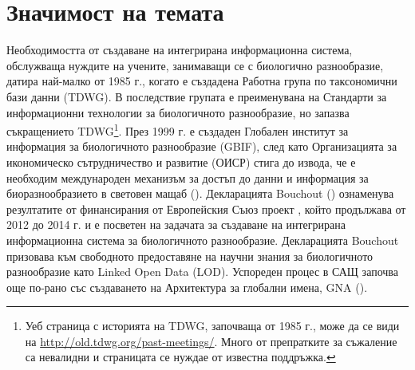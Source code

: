 \label{chapter-introduction} 
\newcommand{\keyword}[1]{\textbf{#1}}
\newcommand{\tabhead}[1]{\textbf{#1}}
\newcommand{\code}[1]{\texttt{#1}}
\newcommand{\file}[1]{\texttt{\bfseries#1}}
\newcommand{\option}[1]{\texttt{\itshape#1}}


\section* {Значимост на темата}

Необходимостта от създаване на интегрирана информационна система, обслужваща нуждите на учените, занимаващи се с биологично разнообразие, датира най-малко от 1985 г., когато е създадена Работна група по таксономични бази данни (TDWG). В последствие групата е преименувана на Стандарти за информационни технологии за биологичното разнообразие, но запазва съкращението TDWG\footnote{Уеб страница с историята на TDWG, започваща от 1985 г., може да се види на \url{http://old.tdwg.org/past-meetings/}. Много от препратките за съжаление са невалидни и страницата се нуждае от известна поддръжка.}. През 1999 г. е създаден Глобален институт за информация за биологичното разнообразие (GBIF), след като Организацията за икономическо сътрудничество и развитие (ОИСР) стига до извода, че е необходим международен механизъм за достъп до данни и информация за биоразнообразието в световен мащаб (\cite{noauthor_what_nodate}). Декларацията Bouchout (\cite{noauthor_bouchout_2014}) ознаменува резултатите от финансирания от Европейския Съюз проект \cite{noauthor_pro-ibiosphere_nodate}, който продължава от 2012 до 2014 г. и е посветен на задачата за създаване на интегрирана информационна система за биологичното разнообразие. Декларацията Bouchout призовава към свободното предоставяне на научни знания за биологичното разнообразие като Linked Open Data (LOD). Успореден процес в САЩ започва още по-рано със създаването на Архитектура за глобални имена, GNA (\cite{patterson_names_2010, pyle_towards_2016}).

